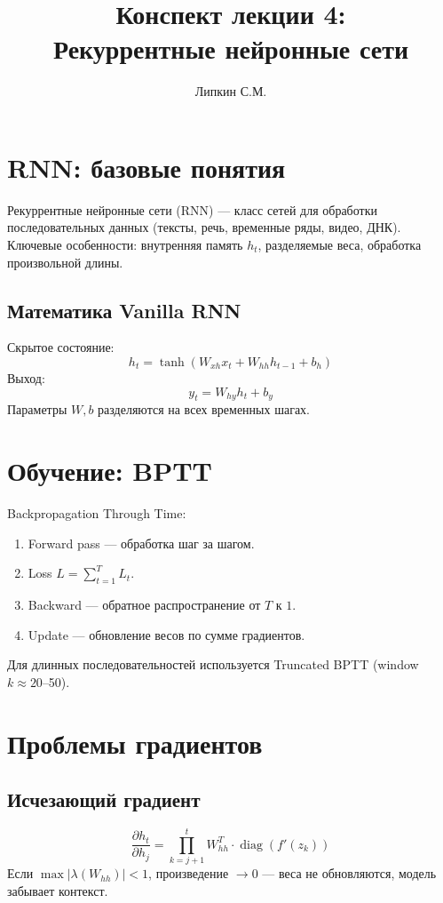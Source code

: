 \documentclass[a4paper,12pt]{article}
\title{Конспект лекции 4: \\ Рекуррентные нейронные сети}
\author{Липкин С.М.}
\date{}
\begin{document}
\maketitle

\section{RNN: базовые понятия}

Рекуррентные нейронные сети (RNN) — класс сетей для обработки последовательных данных (тексты, речь, временные ряды, видео, ДНК). Ключевые особенности: внутренняя память $h_t$, разделяемые веса, обработка произвольной длины.

\subsection{Математика Vanilla RNN}
Скрытое состояние:
\[
h_t = \tanh(W_{xh} x_t + W_{hh} h_{t-1} + b_h)
\]
Выход:
\[
y_t = W_{hy} h_t + b_y
\]
Параметры $W, b$ разделяются на всех временных шагах.

\section{Обучение: BPTT}

Backpropagation Through Time:
\begin{enumerate}
    \item Forward pass — обработка шаг за шагом.
    \item Loss $L = \sum_{t=1}^{T} L_t$.
    \item Backward — обратное распространение от $T$ к $1$.
    \item Update — обновление весов по сумме градиентов.
\end{enumerate}
Для длинных последовательностей используется Truncated BPTT (window $k \approx 20$--50).

\section{Проблемы градиентов}

\subsection{Исчезающий градиент}
\[
\frac{\partial h_t}{\partial h_j} = \prod_{k=j+1}^{t} W_{hh}^{T} \cdot \operatorname{diag}(f'(z_k))
\]
Если $\max |\lambda(W_{hh})| < 1$, произведение $\to 0$ — веса не обновляются, модель забывает контекст.
\end{document}
